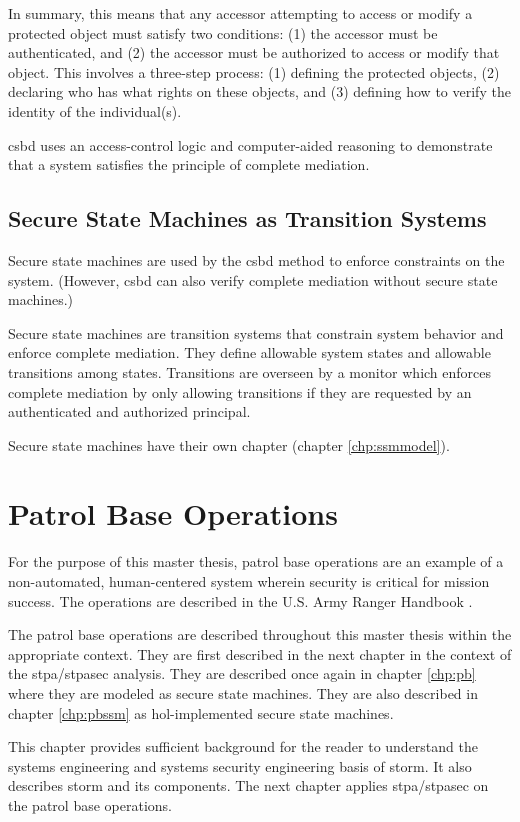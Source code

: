 \documentclass[../../main/main.tex]{subfiles}
\begin{document}
In summary, this means that any accessor attempting to access or modify a protected object must satisfy two conditions: (1) the accessor must be authenticated, and (2) the accessor must be authorized to access or modify that object.  This involves a three-step process: (1) defining the protected objects, (2) declaring who has what rights on these objects, and (3) defining how to verify the identity of the individual(s).  

\gls{csbd} uses an access-control logic and computer-aided reasoning to demonstrate that a system satisfies the principle of complete mediation.

\subsection{Secure State Machines as Transition Systems }\label{sssect:ssmts}
Secure state machines are used by the \gls{csbd} method to enforce constraints on the system.  (However, \gls{csbd} can also verify complete mediation without secure state machines.)

Secure state machines are transition systems that constrain system behavior and enforce complete mediation.  They define allowable system states and allowable transitions among states. Transitions are overseen by a monitor which enforces complete mediation by only allowing transitions if they are requested by an authenticated and authorized principal. 

Secure state machines have their own chapter (chapter \ref{chp:ssmmodel}).
\section{Patrol Base Operations}\label{sec:stormpb}
For the purpose of this master thesis, patrol base operations are an example of a non-automated, human-centered system wherein security is critical for mission success.  The operations are described in the U.S. Army Ranger Handbook \cite{rangermanual}.

The patrol base operations are described throughout this master thesis within the appropriate context.  They are first described in the next chapter in the context of the \gls{stpa}/\gls{stpasec} analysis.  They are described once again in chapter \ref{chp:pb} where they are modeled as secure state machines.  They are also described in chapter \ref{chp:pbssm} as \gls{hol}-implemented secure state machines.

This chapter provides sufficient background for the reader to understand the systems engineering and systems security engineering basis of \gls{storm}.  It also describes \gls{storm} and its components.  The next chapter applies  \gls{stpa}/\gls{stpasec} on the patrol base operations.
\end{document}
